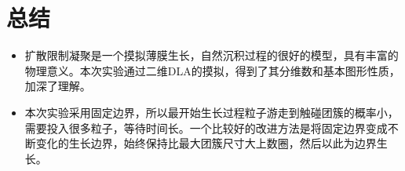 \documentclass[UTF8]{ctexart}
\begin{document}
	
	

%		

	\section{总结}

	
	\begin{itemize}
		
		\item 扩散限制凝聚是一个摸拟薄膜生长，自然沉积过程的很好的模型，具有丰富的物理意义。本次实验通过二维DLA的摸拟，得到了其分维数和基本图形性质，加深了理解。
		
		\item 本次实验采用固定边界，所以最开始生长过程粒子游走到触碰团簇的概率小，需要投入很多粒子，等待时间长。一个比较好的改进方法是将固定边界变成不断变化的生长边界，始终保持比最大团簇尺寸大上数圈，然后以此为边界生长。
		
	\end{itemize}
\end{document}
